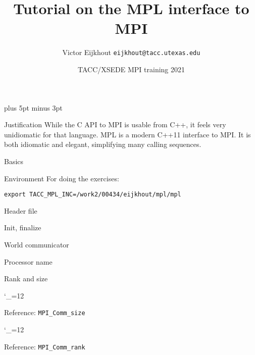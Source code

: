 \documentclass[11pt,headernav]{beamer}
\newcommand\referenceframe{\begingroup\catcode`\_=12 \referenceframett}
\gdef\referenceframett#1{
  \begin{numberedframe}{Reference: \texttt{MPI_#1}}
    \small
    
  \end{numberedframe}\endgroup}
\newcounter{tacc}
\def\Location{}%
\def\courseyear{2021}
\def\Location{TACC APP institute MPI training \courseyear}
\def\Location{TACC/XSEDE MPI training \courseyear}
\begin{document}
\parskip=10pt plus 5pt minus 3pt

\title{Tutorial on the MPL interface to MPI}
\author{Victor Eijkhout {\tt eijkhout@tacc.utexas.edu}}
\date{\Location}

\begin{frame}
  \titlepage
\end{frame}

\begin{xsede}
  
\end{xsede}

\begin{frame}{Justification}
  While the C API to MPI is usable from C++, it feels very unidiomatic
  for that language.
  \acf{MPL} is a modern C++11 interface to MPI.
  It is both idiomatic and elegant, simplifying many calling sequences.
\end{frame}

 {Basics}

\begin{numberedframe}{Environment}
  For doing the exercises:
\begin{verbatim}
export TACC_MPL_INC=/work2/00434/eijkhout/mpl/mpl
\end{verbatim}
\end{numberedframe}

\begin{numberedframe}{Header file}
  
\end{numberedframe}
\begin{numberedframe}{Init, finalize}
  
\end{numberedframe}
\begin{numberedframe}{World communicator}
  
\end{numberedframe}
\begin{numberedframe}{Processor name}
  
\end{numberedframe}
\begin{numberedframe}{Rank and size}
  
\end{numberedframe}
\referenceframe{Comm_size}
\referenceframe{Comm_rank}
\end{document}
